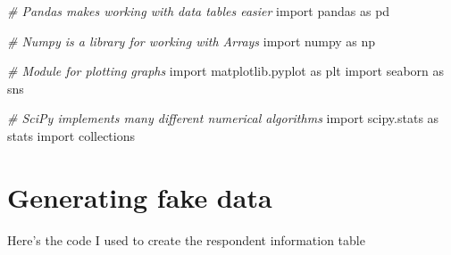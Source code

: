 \documentclass[]{book}
\newenvironment{Shaded}{\begin{snugshade}}{\end{snugshade}}
\newcommand{\CommentTok}[1]{\textcolor[rgb]{0.56,0.35,0.01}{\textit{#1}}}
\newcommand{\NormalTok}[1]{#1}
\begin{document}
\begin{Shaded}
\begin{Highlighting}[]
\CommentTok{# Pandas makes working with data tables easier}
\NormalTok{import pandas as pd}

\CommentTok{# Numpy is a library for working with Arrays}
\NormalTok{import numpy as np}

\CommentTok{# Module for plotting graphs}
\NormalTok{import matplotlib.pyplot as plt}
\NormalTok{import seaborn as sns}

\CommentTok{# SciPy implements many different numerical algorithms}
\NormalTok{import scipy.stats as stats}
\NormalTok{import collections}
\end{Highlighting}
\end{Shaded}

\chapter{Generating fake data}\label{appendixC}

Here's the code I used to create the respondent information table
\end{document}

